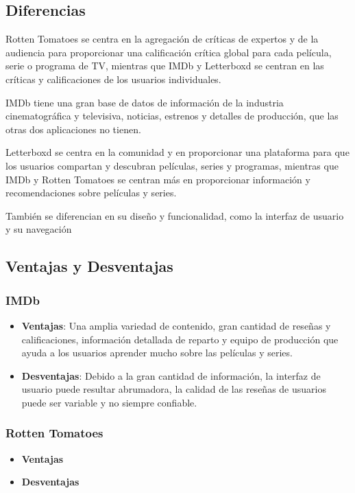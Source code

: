 \subsection{Diferencias}

Rotten Tomatoes se centra en la agregación de críticas de expertos y de la audiencia para proporcionar una calificación crítica global para cada película, serie o programa de TV, mientras que IMDb y Letterboxd se centran en las críticas y calificaciones de los usuarios individuales.

IMDb tiene una gran base de datos de información de la industria cinematográfica y televisiva, noticias, estrenos y detalles de producción, que las otras dos aplicaciones no tienen.

Letterboxd se centra en la comunidad y en proporcionar una plataforma para que los usuarios compartan y descubran películas, series y programas, mientras que IMDb y Rotten Tomatoes se centran más en proporcionar información y recomendaciones sobre películas y series.

También se diferencian en su diseño y funcionalidad, como la interfaz de usuario y su navegación

\subsection{Ventajas y Desventajas}

\subsubsection{IMDb}

\begin{itemize}
    \item \textbf{Ventajas}: Una amplia variedad de contenido, gran cantidad de reseñas y calificaciones, información detallada de reparto y equipo de producción que ayuda a los usuarios aprender mucho sobre las películas y series.
    \item \textbf{Desventajas}: Debido a la gran cantidad de información, la interfaz de usuario puede resultar abrumadora, la calidad de las reseñas de usuarios puede ser variable y no siempre confiable.
\end{itemize}

\subsubsection{Rotten Tomatoes}

\begin{itemize}
    \item \textbf{Ventajas}
    \item \textbf{Desventajas}
\end{itemize}

